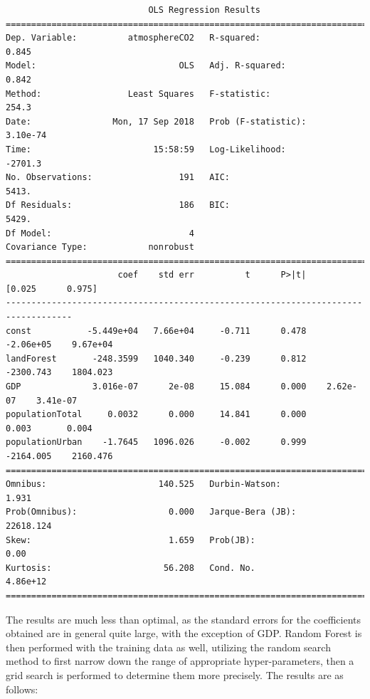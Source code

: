 \documentclass[11pt,a4paper,titlepage]{article}
\begin{document}
\begin{verbatim}
                            OLS Regression Results                            
==============================================================================
Dep. Variable:          atmosphereCO2   R-squared:                       0.845
Model:                            OLS   Adj. R-squared:                  0.842
Method:                 Least Squares   F-statistic:                     254.3
Date:                Mon, 17 Sep 2018   Prob (F-statistic):           3.10e-74
Time:                        15:58:59   Log-Likelihood:                -2701.3
No. Observations:                 191   AIC:                             5413.
Df Residuals:                     186   BIC:                             5429.
Df Model:                           4                                         
Covariance Type:            nonrobust                                         
===================================================================================
                      coef    std err          t      P>|t|      [0.025      0.975]
-----------------------------------------------------------------------------------
const           -5.449e+04   7.66e+04     -0.711      0.478   -2.06e+05    9.67e+04
landForest       -248.3599   1040.340     -0.239      0.812   -2300.743    1804.023
GDP              3.016e-07      2e-08     15.084      0.000    2.62e-07    3.41e-07
populationTotal     0.0032      0.000     14.841      0.000       0.003       0.004
populationUrban    -1.7645   1096.026     -0.002      0.999   -2164.005    2160.476
==============================================================================
Omnibus:                      140.525   Durbin-Watson:                   1.931
Prob(Omnibus):                  0.000   Jarque-Bera (JB):            22618.124
Skew:                           1.659   Prob(JB):                         0.00
Kurtosis:                      56.208   Cond. No.                     4.86e+12
==============================================================================
\end{verbatim}

The results are much less than optimal, as the standard errors for the coefficients obtained are in general quite large, with the exception of GDP. Random Forest is then performed with the training data as well, utilizing the random search method to first narrow down the range of appropriate hyper-parameters, then a grid search is performed to determine them more precisely. The results are as follows:
\end{document}
